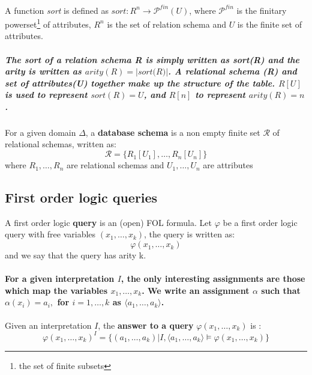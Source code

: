 \begin{defs}
	\label{defs:dbn_sort_function}
	A function \textit{sort} is defined as $sort:R^{n}\rightarrow{\mathcal{P}^{fin}}(U)$, where ${\mathcal{P}^{fin}}$ is the finitary powerset\footnote{the set of finite subsets} of attributes, $R^{n}$ is the set of relation schema and $U$ is the finite set of attributes.
\end{defs}

\subparagraph*{\textnormal{The sort of a relation schema \textit{R} is simply written as \textit{sort(R)} and the arity is written as $arity(R) = |\textit{sort(R)}|$. A relational schema (\textit{R}) and set of attributes(\textit{U}) together make up the structure of the table. $R[U]$ is used to represent $sort(R) = U$, and $R[n]$ to represent $arity(R) = n$.}}

\begin{defs}
	\label{defs:dbn_database_schema}
	For a given domain $\Delta$, a \textbf{database schema} is a non empty finite set $\mathcal{R}$ of relational schemas, written as:
	\begin{equation*}
	\mathcal{R} = \{R_{1}[U_{1}],\ldots,R_{n}[U_{n}]\}
	\end{equation*}
	where $R_{1},\ldots,R_{n}$ are relational schemas and $U_{1},\ldots,U_{n}$ are attributes
\end{defs}

\subsection*{First order logic queries}
\begin{defs}
A first order logic \textbf{query} is an (open) FOL formula. Let $\varphi$ be a first order logic query with free variables $(x_{1},\ldots,x_{k})$, the query is written as:
\begin{equation*}
\varphi (x_{1},\ldots,x_{k})
\end{equation*}
and we say that the query has arity k.
\end{defs}
\paragraph*{\textnormal{For a given interpretation $I$, the only interesting assignments are those which map the variables $x_{1},\ldots,x_{k}$. We write an assignment $\alpha$ such that $\alpha(x_{i}) = a_{i},$ for $i = 1,\ldots,k$ as $\langle a_{1},\ldots,a_{k} \rangle$.}}

\begin{defs}
Given an interpretation $I$, the \textbf{answer to a query} $\varphi (x_{1},\ldots,x_{k})$ is :
\begin{equation*}
{\varphi (x_{1},\ldots,x_{k})}^{I} = \{(a_{1},\ldots,a_{k}) | I,\langle a_{1},\ldots,a_{k} \rangle \models \varphi (x_{1},\ldots,x_{k}) \}
\end{equation*}
\end{defs}

